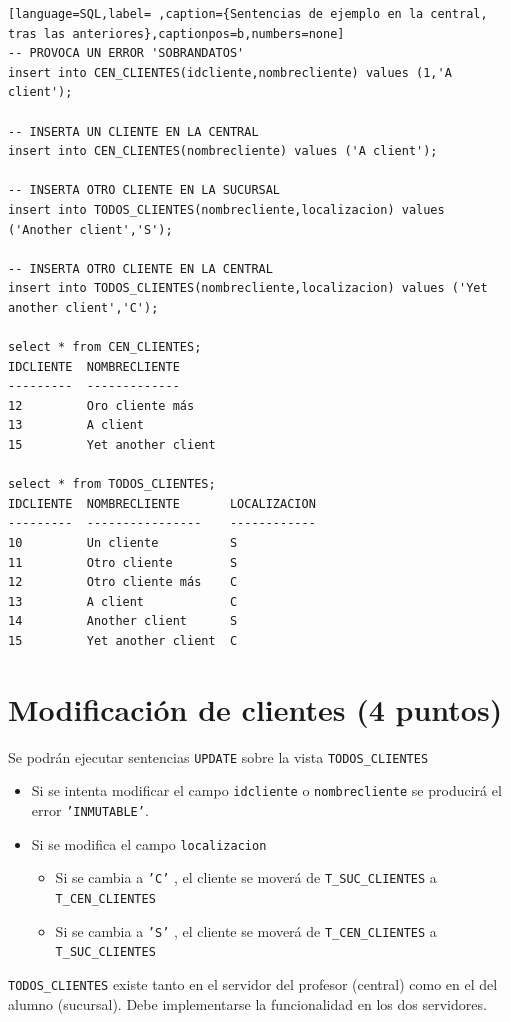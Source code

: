 \documentclass[a4paper]{article}
\begin{document}
\begin{lstlisting}[language=SQL,label= ,caption={Sentencias de ejemplo en la central, tras las anteriores},captionpos=b,numbers=none]
-- PROVOCA UN ERROR 'SOBRANDATOS'
insert into CEN_CLIENTES(idcliente,nombrecliente) values (1,'A client');

-- INSERTA UN CLIENTE EN LA CENTRAL
insert into CEN_CLIENTES(nombrecliente) values ('A client');

-- INSERTA OTRO CLIENTE EN LA SUCURSAL
insert into TODOS_CLIENTES(nombrecliente,localizacion) values ('Another client','S');

-- INSERTA OTRO CLIENTE EN LA CENTRAL
insert into TODOS_CLIENTES(nombrecliente,localizacion) values ('Yet another client','C');

select * from CEN_CLIENTES;
IDCLIENTE  NOMBRECLIENTE
---------  -------------
12         Oro cliente más
13         A client
15         Yet another client

select * from TODOS_CLIENTES;
IDCLIENTE  NOMBRECLIENTE       LOCALIZACION
---------  ----------------    ------------
10         Un cliente          S
11         Otro cliente        S
12         Otro cliente más    C
13         A client            C
14         Another client      S
15         Yet another client  C
\end{lstlisting}

\section{Modificación de clientes (4 puntos)}
\label{sec:org0000015}
Se podrán ejecutar sentencias \texttt{UPDATE} sobre la vista \texttt{TODOS\_CLIENTES}
\begin{itemize}
\item Si se intenta modificar el campo \texttt{idcliente} o \texttt{nombrecliente} se producirá el error \texttt{'INMUTABLE'}.
\item Si se modifica el campo \texttt{localizacion}
\begin{itemize}
\item Si se cambia a \texttt{'C'} , el cliente se moverá de \texttt{T\_SUC\_CLIENTES} a \texttt{T\_CEN\_CLIENTES}
\item Si se cambia a \texttt{'S'} , el cliente se moverá de \texttt{T\_CEN\_CLIENTES} a \texttt{T\_SUC\_CLIENTES}
\end{itemize}
\end{itemize}

\begin{Aviso}
\texttt{TODOS\_CLIENTES} existe tanto en el servidor del profesor (central)  como en el del alumno (sucursal). Debe implementarse la funcionalidad en los dos servidores.
\end{Aviso}
\end{document}
